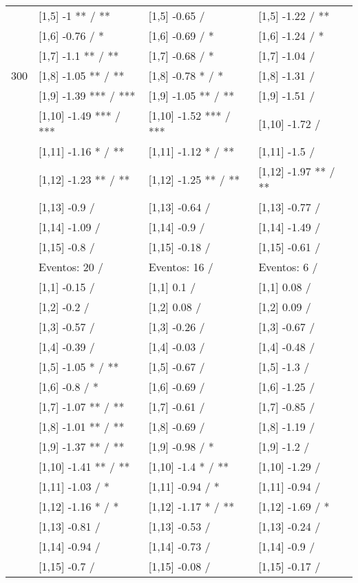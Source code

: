 \begin{table}
\begin{tabular}[t]{llll}
 & {}[1,5] -1 ** / ** & {}[1,5] -0.65  / & {}[1,5] -1.22  / **\\
 & {}[1,6] -0.76  / * & {}[1,6] -0.69  / * & {}[1,6] -1.24  / *\\
 & {}[1,7] -1.1 ** / ** & {}[1,7] -0.68  / * & {}[1,7] -1.04  /\\
300 & {}[1,8] -1.05 ** / ** & {}[1,8] -0.78 * / * & {}[1,8] -1.31  /\\
\addlinespace
 & {}[1,9] -1.39 *** / *** & {}[1,9] -1.05 ** / ** & {}[1,9] -1.51  /\\
 & {}[1,10] -1.49 *** / *** & {}[1,10] -1.52 *** / *** & {}[1,10] -1.72  /\\
 & {}[1,11] -1.16 * / ** & {}[1,11] -1.12 * / ** & {}[1,11] -1.5  /\\
 & {}[1,12] -1.23 ** / ** & {}[1,12] -1.25 ** / ** & {}[1,12] -1.97 ** / **\\
 & {}[1,13] -0.9  / & {}[1,13] -0.64  / & {}[1,13] -0.77  /\\
\addlinespace
 & {}[1,14] -1.09  / & {}[1,14] -0.9  / & {}[1,14] -1.49  /\\
 & {}[1,15] -0.8  / & {}[1,15] -0.18  / & {}[1,15] -0.61  /\\
 & Eventos:  20 / & Eventos:  16 / & Eventos:  6 /\\
 & {}[1,1] -0.15  / & {}[1,1] 0.1  / & {}[1,1] 0.08  /\\
 & {}[1,2] -0.2  / & {}[1,2] 0.08  / & {}[1,2] 0.09  /\\
\addlinespace
 & {}[1,3] -0.57  / & {}[1,3] -0.26  / & {}[1,3] -0.67  /\\
 & {}[1,4] -0.39  / & {}[1,4] -0.03  / & {}[1,4] -0.48  /\\
 & {}[1,5] -1.05 * / ** & {}[1,5] -0.67  / & {}[1,5] -1.3  /\\
 & {}[1,6] -0.8  / * & {}[1,6] -0.69  / & {}[1,6] -1.25  /\\
 & {}[1,7] -1.07 ** / ** & {}[1,7] -0.61  / & {}[1,7] -0.85  /\\
\addlinespace
500 & {}[1,8] -1.01 ** / ** & {}[1,8] -0.69  / & {}[1,8] -1.19  /\\
 & {}[1,9] -1.37 ** / ** & {}[1,9] -0.98  / * & {}[1,9] -1.2  /\\
 & {}[1,10] -1.41 ** / ** & {}[1,10] -1.4 * / ** & {}[1,10] -1.29  /\\
 & {}[1,11] -1.03  / * & {}[1,11] -0.94  / * & {}[1,11] -0.94  /\\
 & {}[1,12] -1.16 * / * & {}[1,12] -1.17 * / ** & {}[1,12] -1.69  / *\\
\addlinespace
 & {}[1,13] -0.81  / & {}[1,13] -0.53  / & {}[1,13] -0.24  /\\
 & {}[1,14] -0.94  / & {}[1,14] -0.73  / & {}[1,14] -0.9  /\\
 & {}[1,15] -0.7  / & {}[1,15] -0.08  / & {}[1,15] -0.17  /\\
\bottomrule
\end{tabular}
\end{table}
